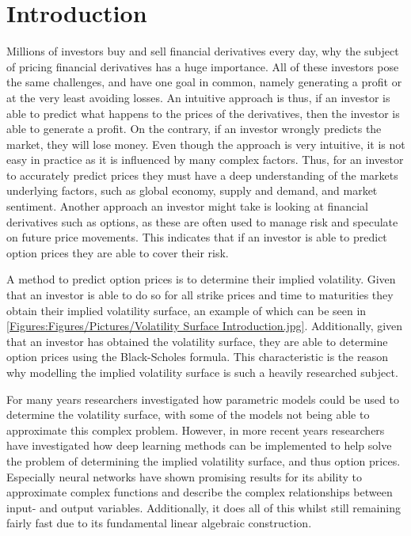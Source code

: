 \chapter{Introduction}\label{Ch.Introduction}
Millions of investors buy and sell financial derivatives every day, why the subject of pricing financial derivatives has a huge importance. All of these investors pose the same challenges, and have one goal in common, namely generating a profit or at the very least avoiding losses. An intuitive approach is thus, if an investor is able to predict what happens to the prices of the derivatives, then the investor is able to generate a profit. On the contrary, if an investor wrongly predicts the market, they will lose money. Even though the approach is very intuitive, it is not easy in practice as it is influenced by many complex factors. Thus, for an investor to accurately predict prices they must have a deep understanding of the markets underlying factors, such as global economy, supply and demand, and market sentiment. Another approach an investor might take is looking at financial derivatives such as options, as these are often used to manage risk and speculate on future price movements. This indicates that if an investor is able to predict option prices they are able to cover their risk.

A method to predict option prices is to determine their implied volatility. Given that an investor is able to do so for all strike prices and time to maturities they obtain their implied volatility surface, an example of which can be seen in \autoref{Figures:Figures/Pictures/Volatility Surface Introduction.jpg}. Additionally, given that an investor has obtained the volatility surface, they are able to determine option prices using the Black-Scholes formula. This characteristic is the reason why modelling the implied volatility surface is such a heavily researched subject.


For many years researchers investigated how parametric models could be used to determine the volatility surface, with some of the models not being able to approximate this complex problem. However, in more recent years researchers have investigated how deep learning methods can be implemented to help solve the problem of determining the implied volatility surface, and thus option prices. Especially neural networks have shown promising results for its ability to approximate complex functions and describe the complex relationships between input- and output variables. Additionally, it does all of this whilst still remaining fairly fast due to its fundamental linear algebraic construction. 

